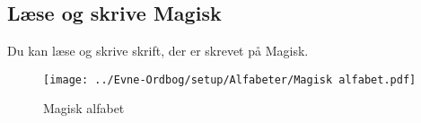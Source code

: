 \subsection*{Læse og skrive Magisk}
Du kan læse og skrive skrift, der er skrevet på Magisk.\\
\begin{figure}[H]
    \centering
    \texttt{[image: ../Evne-Ordbog/setup/Alfabeter/Magisk alfabet.pdf]}
    \caption{Magisk alfabet}
\end{figure}